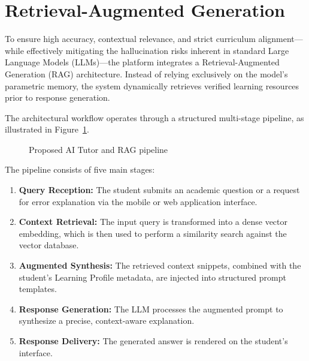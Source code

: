 \section{Retrieval-Augmented Generation}
\label{sec:rag}

To ensure high accuracy, contextual relevance, and strict curriculum alignment---while effectively mitigating the hallucination risks inherent in standard Large Language Models (LLMs)---the platform integrates a Retrieval-Augmented Generation (RAG) architecture. Instead of relying exclusively on the model's parametric memory, the system dynamically retrieves verified learning resources prior to response generation.

The architectural workflow operates through a structured multi-stage pipeline, as illustrated in Figure~\ref{fig:rag_pipeline}.

\begin{figure}[H]
	\centering
{}
	\caption{Proposed AI Tutor and RAG pipeline}
	\label{fig:rag_pipeline}
\end{figure}

The pipeline consists of five main stages:

\begin{enumerate}
	\item \textbf{Query Reception:} The student submits an academic question or a request for error explanation via the mobile or web application interface.
	\item \textbf{Context Retrieval:} The input query is transformed into a dense vector embedding, which is then used to perform a similarity search against the vector database.
	\item \textbf{Augmented Synthesis:} The retrieved context snippets, combined with the student's Learning Profile metadata, are injected into structured prompt templates.
	\item \textbf{Response Generation:} The LLM processes the augmented prompt to synthesize a precise, context-aware explanation.
	\item \textbf{Response Delivery:} The generated answer is rendered on the student's interface.
\end{enumerate}
